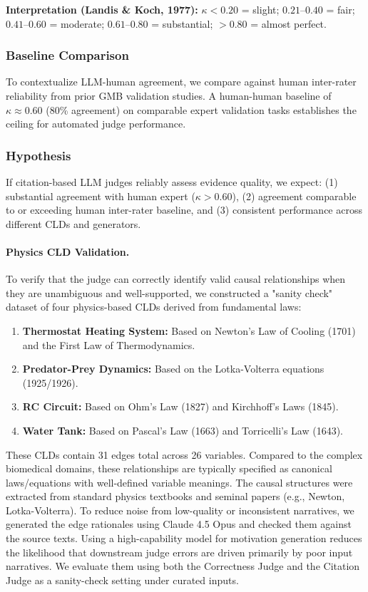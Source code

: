 \textbf{Interpretation (Landis \& Koch, 1977):} $\kappa < 0.20$ = slight; $0.21$--$0.40$ = fair; $0.41$--$0.60$ = moderate; $0.61$--$0.80$ = substantial; $> 0.80$ = almost perfect.

\subsubsection{Baseline Comparison}

To contextualize LLM-human agreement, we compare against human inter-rater reliability from prior GMB validation studies. A human-human baseline of $\kappa \approx 0.60$ (80\% agreement) on comparable expert validation tasks establishes the ceiling for automated judge performance.

\subsubsection{Hypothesis}

If citation-based LLM judges reliably assess evidence quality, we expect: (1) substantial agreement with human expert ($\kappa > 0.60$), (2) agreement comparable to or exceeding human inter-rater baseline, and (3) consistent performance across different CLDs and generators.

\paragraph{Physics CLD Validation.}
To verify that the judge can correctly identify valid causal relationships when they are unambiguous and well-supported, we constructed a "sanity check" dataset of four physics-based CLDs derived from fundamental laws:
\begin{enumerate}[noitemsep]
    \item \textbf{Thermostat Heating System:} Based on Newton's Law of Cooling (1701) and the First Law of Thermodynamics.
    \item \textbf{Predator-Prey Dynamics:} Based on the Lotka-Volterra equations (1925/1926).
    \item \textbf{RC Circuit:} Based on Ohm's Law (1827) and Kirchhoff's Laws (1845).
    \item \textbf{Water Tank:} Based on Pascal's Law (1663) and Torricelli's Law (1643).
\end{enumerate}
These CLDs contain 31 edges total across 26 variables. Compared to the complex biomedical domains, these relationships are typically specified as canonical laws/equations with well-defined variable meanings. The causal structures were extracted from standard physics textbooks and seminal papers (e.g., Newton, Lotka-Volterra). To reduce noise from low-quality or inconsistent narratives, we generated the edge rationales using Claude 4.5 Opus and checked them against the source texts. Using a high-capability model for motivation generation reduces the likelihood that downstream judge errors are driven primarily by poor input narratives. We evaluate them using both the Correctness Judge and the Citation Judge as a sanity-check setting under curated inputs.

